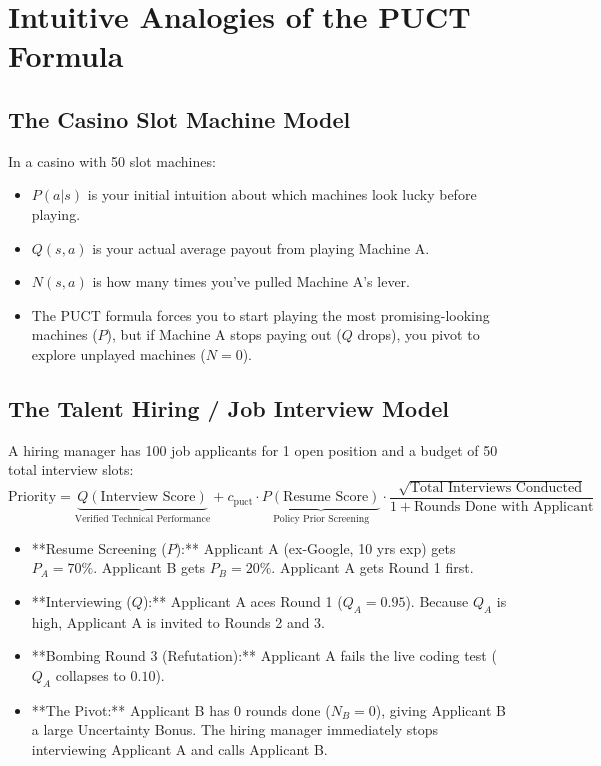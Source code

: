 \documentclass[11pt,a4paper]{report}
\begin{document}
\section{Intuitive Analogies of the PUCT Formula}

\subsection{The Casino Slot Machine Model}
In a casino with 50 slot machines:
\begin{itemize}
    \item $P(a|s)$ is your initial intuition about which machines look lucky before playing.
    \item $Q(s,a)$ is your actual average payout from playing Machine A.
    \item $N(s,a)$ is how many times you've pulled Machine A's lever.
    \item The PUCT formula forces you to start playing the most promising-looking machines ($P$), but if Machine A stops paying out ($Q$ drops), you pivot to explore unplayed machines ($N=0$).
\end{itemize}

\subsection{The Talent Hiring / Job Interview Model}
A hiring manager has 100 job applicants for 1 open position and a budget of 50 total interview slots:
\begin{equation}
\text{Priority} = \underbrace{Q(\text{Interview Score})}_{\text{Verified Technical Performance}} + c_{\text{puct}} \cdot \underbrace{P(\text{Resume Score})}_{\text{Policy Prior Screening}} \cdot \frac{\sqrt{\text{Total Interviews Conducted}}}{1 + \text{Rounds Done with Applicant}}
\end{equation}
\begin{itemize}
    \item **Resume Screening ($P$):** Applicant A (ex-Google, 10 yrs exp) gets $P_A = 70\%$. Applicant B gets $P_B = 20\%$. Applicant A gets Round 1 first.
    \item **Interviewing ($Q$):** Applicant A aces Round 1 ($Q_A = 0.95$). Because $Q_A$ is high, Applicant A is invited to Rounds 2 and 3.
    \item **Bombing Round 3 (Refutation):** Applicant A fails the live coding test ($Q_A$ collapses to $0.10$).
    \item **The Pivot:** Applicant B has $0$ rounds done ($N_B=0$), giving Applicant B a large Uncertainty Bonus. The hiring manager immediately stops interviewing Applicant A and calls Applicant B.
\end{itemize}
\end{document}

